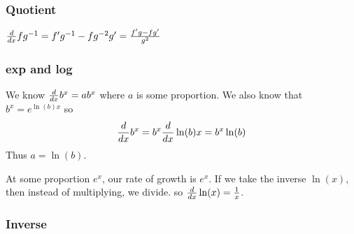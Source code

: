 \documentclass[12pt]{article}
\begin{document}
\subsubsection{Quotient}

\( \dv{x} fg^{-1} = f'g^{-1} - fg^{-2}g' = \frac{f'g - fg'}{g^2} \)

\subsubsection{exp and log}

We know \( \dv{x} b^x = ab^x \) where \( a \) is some proportion.
We also know that \( b^x = e^{\ln(b) x} \) so
\[ \dv{x} b^x = b^x \dv{x} \ln(b) x = b^x \ln(b) \]
Thus \( a = \ln(b) \).

At some proportion \( e^x \), our rate of growth is \( e^x \).
If we take the inverse \( \ln(x) \), then instead of multiplying, we divide.
so \( \dv{x} \ln(x) = \frac{1}{x} \).

\subsubsection{Inverse}
\end{document}
